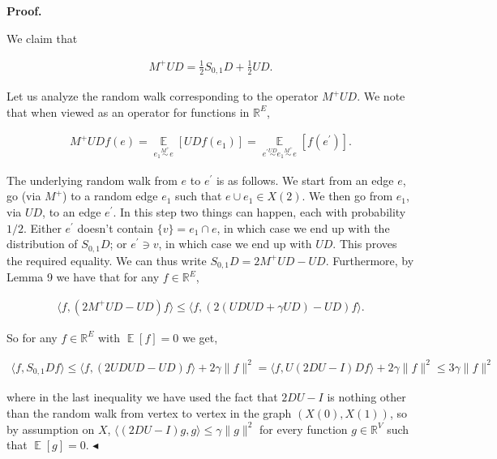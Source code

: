 \par\medskip\noindent\textbf{Proof.}\par




We claim that\par


\[\begin{gathered}
M^{+}UD=\frac{1}{2}S_{0,1}D+\frac{1}{2}UD.
\end{gathered}\]


Let us analyze the random walk corresponding to the operator $M^{+}UD$. We note that when viewed as an operator for functions in $\mathbb{R}^{E}$,\par


\[\begin{gathered}
M^{+}UDf(e)=\operatorname*{\mathbb{E}}_{e_{1}\stackrel{{\scriptstyle M^{+}}}{{\sim}}e}[UDf(e_{1})]=\operatorname*{\mathbb{E}}_{e^{\prime}\stackrel{{\scriptstyle UD}}{{\sim}}e_{1}\stackrel{{\scriptstyle M^{+}}}{{\sim}}e}[f(e^{\prime})].
\end{gathered}\]


The underlying random walk from $e$ to $e^{\prime}$ is as follows.
We start from an edge $e$, go (via $M^{+}$) to a random edge $e_{1}$ such that $e\cup e_{1}\in X(2)$. We then
go from $e_{1}$, via $UD$, to an edge $e^{\prime}$. In this step two things can happen, each with probability $1/2$. Either $e^{\prime}$ doesn’t contain $\{v\}=e_{1}\cap e$, in which case we end up with the distribution of $S_{0,1}D$; or $e^{\prime}\ni v$, in which case we end up with $UD$. This proves the required equality.
We can thus write $S_{0,1}D=2M^{+}UD-UD$. Furthermore, by Lemma 9 we have that for any $f\in\mathbb{R}^{E}$,\par


\[\begin{gathered}
\langle f,(2M^{+}UD-UD)f\rangle\leq\langle f,(2(UDUD+\gamma UD)-UD)f\rangle.
\end{gathered}\]


So for any $f\in\mathbb{R}^{E}$ with $\operatorname*{\mathbb{E}}[f]=0$ we get,\par


\[\begin{gathered}
\langle f,S_{0,1}Df\rangle\leq\langle f,(2UDUD-UD)f\rangle+2\gamma\lVert f\rVert^{2}=\langle f,U(2DU-I)Df\rangle+2\gamma\lVert f\rVert^{2}\leq 3\gamma\lVert f\rVert^{2}
\end{gathered}\]


where in the last inequality we have used the fact that $2DU-I$ is nothing other than the random walk from vertex to vertex in the graph $(X(0),X(1))$, so by assumption on $X$, $\langle(2DU-I)g,g\rangle\leq\gamma\lVert g\rVert^{2}$ for every function $g\in\mathbb{R}^{V}$ such that $\operatorname*{\mathbb{E}}[g]=0$.
$\blacktriangleleft$\par






